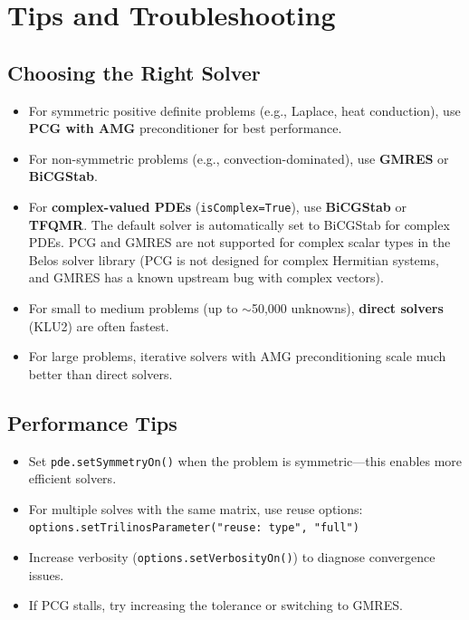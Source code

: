 \section{Tips and Troubleshooting}

\subsection{Choosing the Right Solver}
\begin{itemize}
\item For symmetric positive definite problems (e.g., Laplace, heat conduction), use \textbf{PCG with AMG} preconditioner for best performance.
\item For non-symmetric problems (e.g., convection-dominated), use \textbf{GMRES} or \textbf{BiCGStab}.
\item For \textbf{complex-valued PDEs} (\verb|isComplex=True|), use \textbf{BiCGStab} or \textbf{TFQMR}.
  The default solver is automatically set to BiCGStab for complex PDEs.
  PCG and GMRES are not supported for complex scalar types in the Belos solver library
  (PCG is not designed for complex Hermitian systems, and GMRES has a known upstream bug
  with complex vectors).
\item For small to medium problems (up to $\sim$50,000 unknowns), \textbf{direct solvers} (KLU2) are often fastest.
\item For large problems, iterative solvers with AMG preconditioning scale much better than direct solvers.
\end{itemize}

\subsection{Performance Tips}
\begin{itemize}
\item Set \verb|pde.setSymmetryOn()| when the problem is symmetric---this enables more efficient solvers.
\item For multiple solves with the same matrix, use reuse options: \verb|options.setTrilinosParameter("reuse: type", "full")|
\item Increase verbosity (\verb|options.setVerbosityOn()|) to diagnose convergence issues.
\item If PCG stalls, try increasing the tolerance or switching to GMRES.
\end{itemize}

